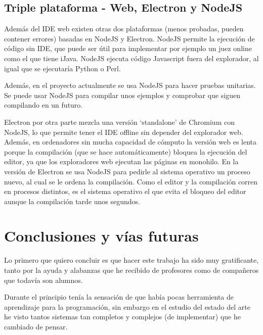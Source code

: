\documentclass{report}
\begin{document}
	
	\section{Triple plataforma - Web, Electron y NodeJS}
	
	
	Además del IDE web existen otras dos plataformas (menos probadas, pueden contener errores) basadas en NodeJS y Electron. NodeJS permite la ejecución de código sin IDE, que puede ser útil para implementar por ejemplo un juez online como el que tiene iJava. NodeJS ejecuta código Javascript fuera del explorador, al igual que se ejecutaría Python o Perl. 
	
	\vspace{10px}
	
	Además, en el proyecto actualmente se usa NodeJS para hacer pruebas unitarias. Se puede usar NodeJS para compilar unos ejemplos y comprobar que siguen compilando en un futuro. 
	
	\vspace{10px}
	
	Electron por otra parte mezcla una versión `standalone' de Chromium con NodeJS, lo que permite tener el IDE offline sin depender del explorador web. Además, en ordenadores sin mucha capacidad de cómputo la versión web es lenta porque la compilación (que se hace automáticamente) bloquea la ejecución del editor, ya que los exploradores web ejecutan las páginas en monohilo. En la versión de Electron se usa NodeJS para pedirle al sistema operativo un proceso nuevo, al cual se le ordena la compilación. Como el editor y la compilación corren en procesos distintos, es el sistema operativo el que evita el bloqueo del editor aunque la compilación tarde unos segundos.  
	
	\chapter{Conclusiones y vías futuras}
	
	Lo primero que quiero concluir es que hacer este trabajo ha sido muy gratificante, tanto por la ayuda y alabanzas que he recibido de profesores como de compañeros que todavía son alumnos.
	
	\vspace{10px}
	
	Durante el principio tenía la sensación de que había pocas herramienta de aprendizaje para la programación, sin embargo en el estudio del estado del arte he visto tantos sistemas tan completos y complejos (de implementar) que he cambiado de pensar. 
	
\end{document}
